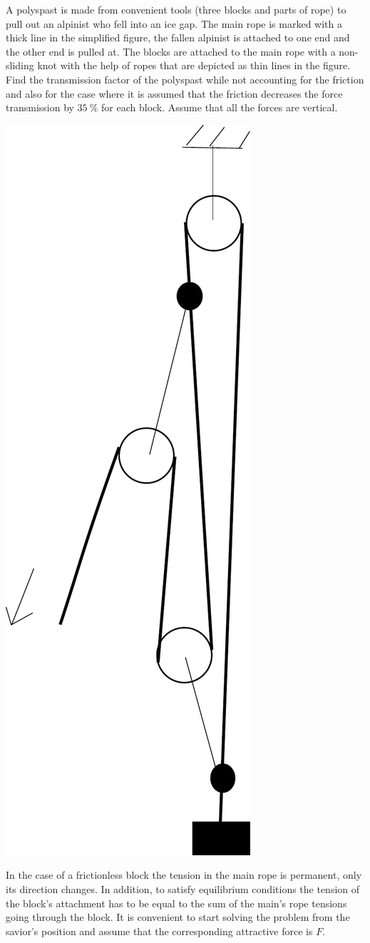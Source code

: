 A polyspast is made from convenient tools (three blocks and parts of rope) to pull out an alpinist who fell into an ice gap. The main rope is marked with a thick line in the simplified figure, the fallen alpinist is attached to one end and the other end is pulled at. The blocks are attached to the main rope with a non-sliding knot with the help of ropes that are depicted as thin lines in the figure. Find the transmission factor of the polyspast while not accounting for the friction and also for the case where it is assumed that the friction decreases the force transmission by $\SI{35}{\percent}$ for each block. Assume that all the forces are vertical.
\begin{center}
\includegraphics[width=0.25\linewidth]{2014-v3g-06-Polyspast}
\end{center}

\hinteng
In the case of a frictionless block the tension in the main rope is permanent, only its direction changes. In addition, to satisfy equilibrium conditions the tension of the block’s attachment has to be equal to the sum of the main’s rope tensions going through the block. It is convenient to start solving the problem from the savior’s position and assume that the corresponding attractive force is $F$.

